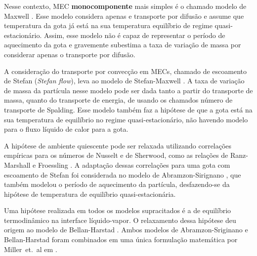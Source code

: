 Nesse contexto, MEC \textbf{monocomponente} mais simples é o  chamado modelo de Maxwell \cite{Fuchs1959,Sazhin2006}.
Esse modelo considera apenas e transporte por difusão e assume que temperatura da gota já está na sua temperatura equilíbrio de regime quasi-estacionário.
Assim, esse modelo não é capaz de representar o período de aquecimento da gota e gravemente subestima a taxa de variação de massa por considerar apenas o transporte por difusão.

A consideração do transporte por convecção em MECs, chamado de escoamento de Stefan (\emph{Stefan flow}), leva ao modelo de Stefan-Maxwell \cite{Law1978}.
A taxa de variação de massa da partícula nesse modelo pode ser dada tanto a partir do transporte de massa, quanto do transporte de energia, de usando os chamados número de transporte de Spalding.
Esse modelo também faz a hipótese de que a gota está na sua temperatura de equilíbrio no regime quasi-estacionário, não havendo modelo para o fluxo líquido de calor para a gota.

A hipótese de ambiente quiescente pode ser relaxada utilizando correlações empíricas para os números de Nusselt e de Sherwood, como as relações de Ranz-Marshall e Froessling \cite{Bird2002}. 
A adaptação dessas correlações para uma gota com escoamento de Stefan foi considerada no modelo de Abramzon-Sirignano \cite{Sirignano1989}, que também modelou o período de aquecimento da partícula, desfazendo-se da hipótese de temperatura de equilíbrio quasi-estacionária.

Uma hipótese realizada em todos os modelos supracitados é a de equilíbrio termodinâmico na interface líquido-vapor.
O relaxamento dessa hipótese deu origem ao modelo de Bellan-Harstad \cite{BellanJ1987}.
Ambos modelos de Abramzon-Sriginano e Bellan-Harstad foram combinados em uma única formulação matemática por Miller~et.~al em \cite{MillerR1998}.

